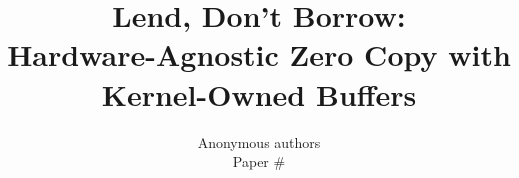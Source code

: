 \documentclass[letterpaper,twocolumn,10pt]{article}
\begin{document}
\date{}
\title{\Large \bf Lend, Don't Borrow:\\ Hardware-Agnostic Zero Copy with Kernel-Owned Buffers}
\author{{\rm Anonymous authors}\\ Paper \#}
\maketitle

\begin{abstract}

\end{abstract}















\printdraftnotes
\end{document}

